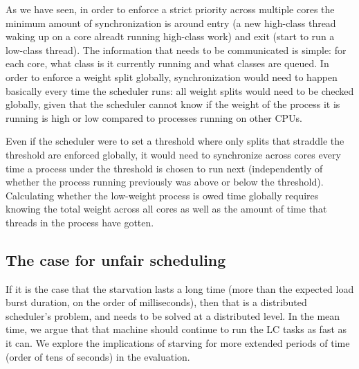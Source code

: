 As we have seen, in order to enforce a strict priority across multiple cores the
minimum amount of synchronization is around entry (a new high-class thread
waking up on a core alreadt running high-class work) and exit (start to run a
low-class thread). The information that needs to be communicated is simple: for
each core, what class is it currently running and what classes are queued. In
order to enforce a weight split globally, synchronization would need to happen
basically every time the scheduler runs: all weight splits would need to be
checked globally, given that the scheduler cannot know if the weight of the
process it is running is high or low compared to processes running on other
CPUs.

Even if the scheduler were to set a threshold where only splits that straddle
the threshold are enforced globally, it would need to synchronize across cores
every time a process under the threshold is chosen to run next (independently of
whether the process running previously was above or below the threshold).
Calculating whether the low-weight process is owed time globally requires
knowing the total weight across all cores as well as the amount of time that
threads in the process have gotten.



\subsection{The case for unfair scheduling}


If it is the case that the starvation lasts a long time (more than the expected
load burst duration, on the order of milliseconds), then that is a distributed
scheduler's problem, and needs to be solved at a distributed level. In the mean
time, we argue that that machine should continue to run the LC tasks as fast as
it can. We explore the implications of starving for more extended periods of
time (order of tens of seconds) in the evaluation.


